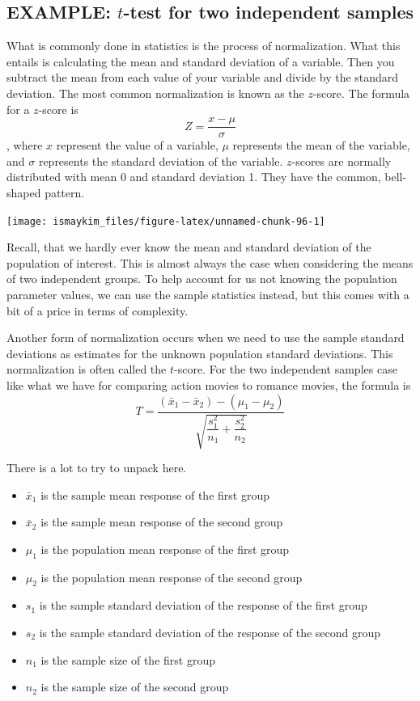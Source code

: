 \documentclass[]{tufte-book}
\providecommand{\tightlist}{%
  \setlength{\itemsep}{0pt}\setlength{\parskip}{0pt}}
\begin{document}
\subsection{\texorpdfstring{EXAMPLE: \(t\)-test for two independent
samples}{EXAMPLE: t-test for two independent samples}}\label{example-t-test-for-two-independent-samples}

What is commonly done in statistics is the process of normalization.
What this entails is calculating the mean and standard deviation of a
variable. Then you subtract the mean from each value of your variable
and divide by the standard deviation. The most common normalization is
known as the \(z\)-score. The formula for a \(z\)-score is
\[Z = \frac{x - \mu}{\sigma}\], where \(x\) represent the value of a
variable, \(\mu\) represents the mean of the variable, and \(\sigma\)
represents the standard deviation of the variable. \(z\)-scores are
normally distributed with mean 0 and standard deviation 1. They have the
common, bell-shaped pattern.

\begin{center}\texttt{[image: ismaykim\_files/figure-latex/unnamed-chunk-96-1]} \end{center}

Recall, that we hardly ever know the mean and standard deviation of the
population of interest. This is almost always the case when considering
the means of two independent groups. To help account for us not knowing
the population parameter values, we can use the sample statistics
instead, but this comes with a bit of a price in terms of complexity.

Another form of normalization occurs when we need to use the sample
standard deviations as estimates for the unknown population standard
deviations. This normalization is often called the \(t\)-score. For the
two independent samples case like what we have for comparing action
movies to romance movies, the formula is
\[T =\dfrac{ (\bar{x}_1 - \bar{x}_2) - (\mu_1 - \mu_2)}{ \sqrt{\dfrac{s_1^2}{n_1} + \dfrac{s_2^2}{n_2}}  }\]

There is a lot to try to unpack here.

\begin{itemize}
\tightlist
\item
  \(\bar{x}_1\) is the sample mean response of the first group
\item
  \(\bar{x}_2\) is the sample mean response of the second group
\item
  \(\mu_1\) is the population mean response of the first group
\item
  \(\mu_2\) is the population mean response of the second group
\item
  \(s_1\) is the sample standard deviation of the response of the first
  group
\item
  \(s_2\) is the sample standard deviation of the response of the second
  group
\item
  \(n_1\) is the sample size of the first group
\item
  \(n_2\) is the sample size of the second group
\end{itemize}
\end{document}
